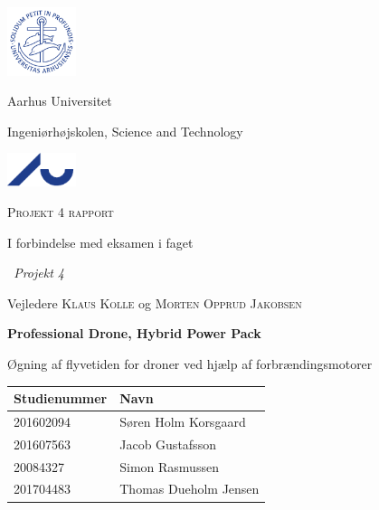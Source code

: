 \begin{titlepage}
	\begin{center}
	\includegraphics[width=2cm]{./figurer/segl.pdf}
	\hfill
	\parbox{.5\linewidth}{%
		\centering
		Aarhus Universitet\par
		\vspace{.05\textheight}
		Ingeniørhøjskolen, Science and Technology\par
	}
	\hfill
	\includegraphics[width=2cm]{./figurer/au.pdf}
	\par
		\vspace{.05\textheight}
		{\LARGE\scshape Projekt 4 rapport\par}
		\vspace{.05\textheight}
		I forbindelse med eksamen i faget\par
		{\itshape\ Projekt 4\par}
		\vspace{.05\textheight}
		Vejledere \textsc{Klaus Kolle} og \textsc{Morten Opprud Jakobsen}\par
		\vspace{.05\textheight}
		{\Huge\bfseries Professional Drone, Hybrid Power Pack \par}
		\vspace{.05\textheight}
		{\large Øgning af flyvetiden for droner ved hjælp af forbrændingsmotorer\par}
		\vfill
		\noindent\begin{tabularx}{\textwidth}{p{5cm}p{10cm}}
			\toprule
			Studienummer & Navn \\
			\midrule
                        201602094 & Søren Holm Korsgaard \\
                        201607563 & Jacob Gustafsson \\
                        20084327 & Simon Rasmussen \\
                        201704483 & Thomas Dueholm Jensen \\
  \bottomrule
  \end{tabularx}
\end{center}
\end{titlepage}



